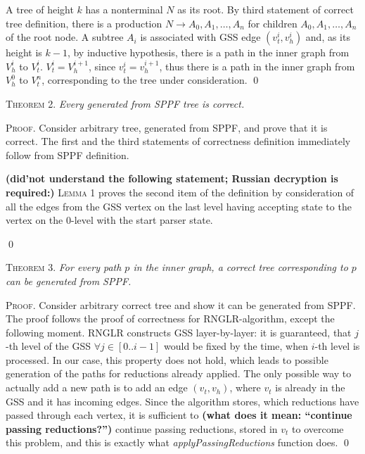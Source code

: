 A tree of height $k$ has a nonterminal $N$ as its root. By third statement of correct tree definition, 
there is a production $N \rightarrow A_{0}, A_{1}, \dots, A_{n}$ for children $A_{0}, A_{1}, \dots, A_{n}$ of the root node. 
A subtree $A_{i}$ is associated with GSS edge $(v_{t}^{i}, v_{h}^{i})$ and, as its height is $k-1$, by inductive hypothesis,
there is a path in the inner graph from $V_{h}^{i}$ to $V_{t}^{i}$. $V_{t}^i = V_{h}^{i+1}$, since $v_{t}^i = v_{h}^{i+1}$, 
thus there is a path in the inner graph from $V_{h}^{0}$ to $V_{t}^{n}$, corresponding to the tree under consideration.
\qed

\textsc{Theorem 2.} 
\textit{Every generated from SPPF tree is correct.}

\textsc{Proof.} Consider arbitrary tree, generated from SPPF, and prove that it is correct. The first and the third statements
of correctness definition immediately follow from SPPF definition. 

{\bf (did'not understand the following statement; Russian decryption is required:)}
\textsc{Lemma 1} proves the second item of the definition by consideration of all the edges from the GSS vertex
on the last level having accepting state to the vertex on the 0-level with the start parser state.

\qed

\textsc{Theorem 3.} 
\textit{For every path $p$ in the inner graph, a correct tree corresponding to $p$ can be generated from SPPF.}

\textsc{Proof.}
Consider arbitrary correct tree and show it can be generated from SPPF. The proof follows the proof of correctness 
for RNGLR-algorithm, except the following moment. RNGLR constructs GSS layer-by-layer: it is guaranteed, that $j$-th 
level of the GSS $\forall j \in [0..i-1]$ would be fixed by the time, when $i$-th level is processed. In our case, 
this property does not hold, which leads to possible generation of the paths for reductions already applied. 
The only possible way to actually add a new path is to add an edge $(v_{t}, v_{h})$, where $v_{t}$ is already in the GSS and 
it has incoming edges. Since the algorithm stores, which reductions have passed through each vertex, it is sufficient to 
{\bf (what does it mean: ``continue passing reductions?'')} continue passing reductions, stored in $v_{t}$ to overcome this problem, 
and this is exactly what \emph{applyPassingReductions} function does. 
\qed
